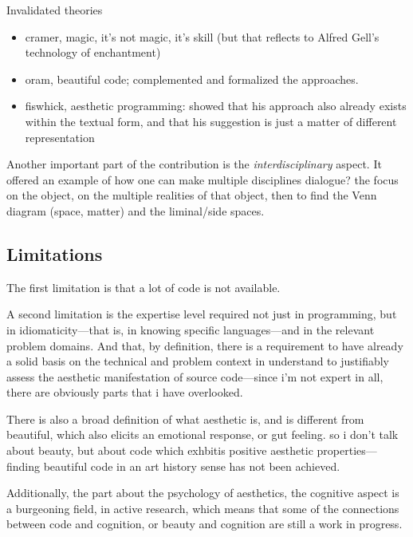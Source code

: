 Invalidated theories
\begin{itemize}
    \item cramer, magic, it's not magic, it's skill (but that reflects to Alfred Gell's technology of enchantment)
    \item oram, beautiful code; complemented and formalized the approaches.
    \item fiswhick, aesthetic programming: showed that his approach also already exists within the textual form, and that his suggestion is just a matter of different representation
\end{itemize}

Another important part of the contribution is the \emph{interdisciplinary} aspect. It offered an example of how one can make multiple disciplines dialogue? the focus on the object, on the multiple realities of that object, then to find the Venn diagram (space, matter) and the liminal/side spaces.



\subsection{Limitations} %

The first limitation is that a lot of code is not available.

A second limitation is the expertise level required not just in programming, but in idiomaticity—that is, in knowing specific languages—and in the relevant problem domains. And that, by definition, there is a requirement to have already a solid basis on the technical and problem context in understand to justifiably assess the aesthetic manifestation of source code—since i'm not expert in all, there are obviously parts that i have overlooked.

There is also a broad definition of what aesthetic is, and is different from beautiful, which also elicits an emotional response, or gut feeling. so i don't talk about beauty, but about code which exhbitis positive aesthetic properties—finding beautiful code in an art history sense has not been achieved.

Additionally, the part about the psychology of aesthetics, the cognitive aspect is a burgeoning field, in active research, which means that some of the connections between code and cognition, or beauty and cognition are still a work in progress.

